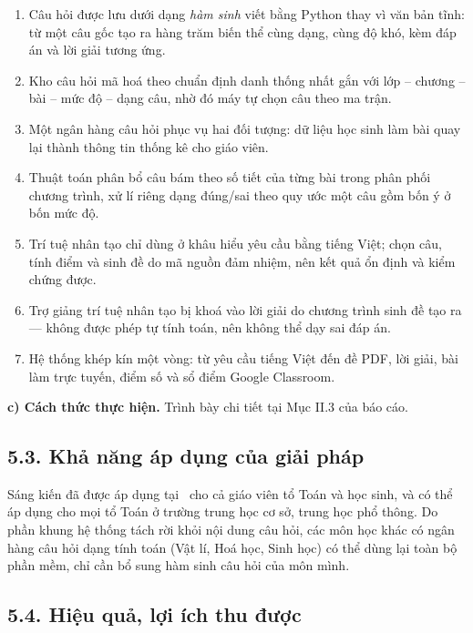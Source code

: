 \begin{enumerate}[label=(\arabic*), leftmargin=1.2cm, itemsep=2pt]
  \item Câu hỏi được lưu dưới dạng \emph{hàm sinh} viết bằng Python thay vì văn
        bản tĩnh: từ một câu gốc tạo ra hàng trăm biến thể cùng dạng, cùng độ
        khó, kèm đáp án và lời giải tương ứng.
  \item Kho câu hỏi mã hoá theo chuẩn định danh thống nhất gắn với lớp -- chương
        -- bài -- mức độ -- dạng câu, nhờ đó máy tự chọn câu theo ma trận.
  \item Một ngân hàng câu hỏi phục vụ hai đối tượng: dữ liệu học sinh làm bài
        quay lại thành thông tin thống kê cho giáo viên.
  \item Thuật toán phân bổ câu bám theo số tiết của từng bài trong phân phối
        chương trình, xử lí riêng dạng đúng/sai theo quy ước một câu gồm bốn ý
        ở bốn mức độ.
  \item Trí tuệ nhân tạo chỉ dùng ở khâu hiểu yêu cầu bằng tiếng Việt; chọn câu,
        tính điểm và sinh đề do mã nguồn đảm nhiệm, nên kết quả ổn định và kiểm
        chứng được.
  \item Trợ giảng trí tuệ nhân tạo bị khoá vào lời giải do chương trình sinh đề
        tạo ra --- không được phép tự tính toán, nên không thể dạy sai đáp án.
  \item Hệ thống khép kín một vòng: từ yêu cầu tiếng Việt đến đề PDF, lời giải,
        bài làm trực tuyến, điểm số và sổ điểm Google Classroom.
\end{enumerate}

\textbf{c) Cách thức thực hiện.} Trình bày chi tiết tại Mục II.3 của báo cáo.

\subsection*{5.3. Khả năng áp dụng của giải pháp}

Sáng kiến đã được áp dụng tại \DONVI\ cho cả giáo viên tổ Toán và học sinh,
và có thể áp dụng cho mọi tổ Toán ở trường trung học cơ sở, trung học phổ
thông. Do phần khung hệ thống tách rời
khỏi nội dung câu hỏi, các môn học khác có ngân hàng câu hỏi dạng tính toán
(Vật lí, Hoá học, Sinh học) có thể dùng lại toàn bộ phần mềm, chỉ cần bổ sung
hàm sinh câu hỏi của môn mình.

\subsection*{5.4. Hiệu quả, lợi ích thu được}

